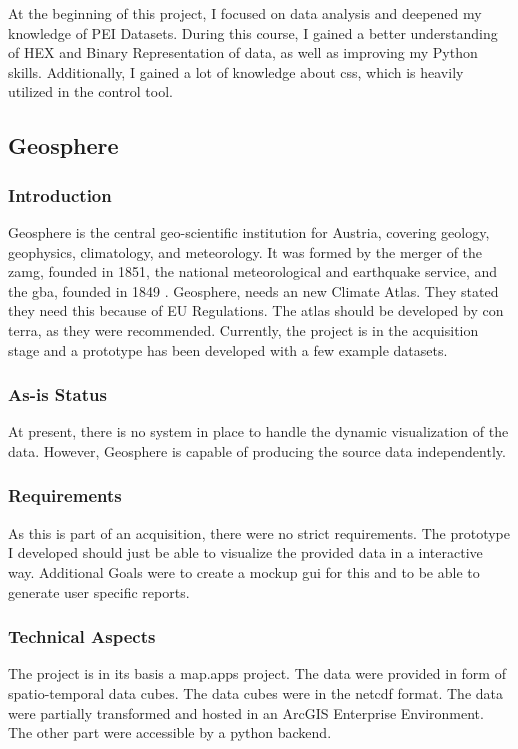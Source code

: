 \documentclass[11pt, titlepage, a4paper]{article}
\begin{document}
At the beginning of this project, I focused on data analysis and deepened my knowledge of PEI Datasets. During this course, I gained a better understanding of HEX and Binary Representation of data, as well as improving my Python skills.  Additionally, I gained a lot of knowledge about \gls{css}, which is heavily utilized in the control tool.%

\subsection{Geosphere}
\subsubsection{Introduction}
Geosphere is the central geo-scientific institution for Austria, covering geology, geophysics, climatology, and meteorology.  It was formed by the merger of the \gls{zamg}, founded in 1851, the national meteorological and earthquake service, and the \gls{gba}, founded in 1849 \cite{geosphereHome2024}.
Geosphere, needs an new Climate Atlas. They stated they need this because of EU Regulations. The atlas should be developed by con terra, as they were recommended. Currently, the project is in the acquisition stage and a prototype has been developed with a few example datasets.
\subsubsection{As-is Status}
At present, there is no system in place to handle the dynamic visualization of the data. However, Geosphere is capable of producing the source data independently.
\subsubsection{Requirements}
As this is part of an acquisition, there were no strict requirements. The prototype I developed should just be able to visualize the provided data in a interactive way. Additional Goals were to create a mockup \gls{gui} for this and to be able to generate user specific reports.
\subsubsection{Technical Aspects}
The project is in its basis a map.apps project. The data were provided in form of spatio-temporal data cubes. The data cubes were in the \gls{netcdf} format. The data were partially transformed and hosted in an ArcGIS Enterprise Environment. The other part were accessible by a python backend.
\end{document}
